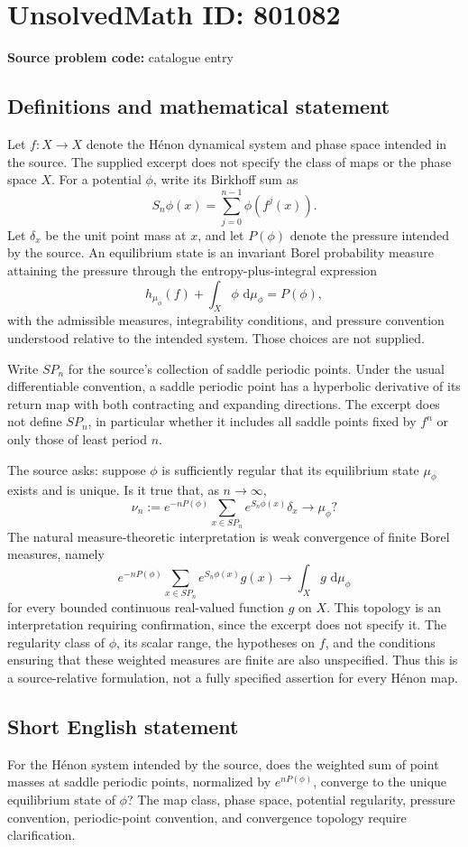 \documentclass[11pt]{article}
\newcommand{\dd}{\,\mathrm{d}}
\begin{document}
\section*{UnsolvedMath ID: 801082}
\textbf{Source problem code:} catalogue entry
\subsection{Definitions and mathematical statement}
Let \(f\colon X\to X\) denote the H\'enon dynamical system and phase space intended in the source. The supplied excerpt does not specify the class of maps or the phase space \(X\). For a potential \(\phi\), write its Birkhoff sum as
\[
S_n\phi(x)=\sum_{j=0}^{n-1}\phi(f^j(x)).
\]
Let \(\delta_x\) be the unit point mass at \(x\), and let \(P(\phi)\) denote the pressure intended by the source. An equilibrium state is an invariant Borel probability measure attaining the pressure through the entropy-plus-integral expression
\[
h_{\mu_\phi}(f)+\int_X\phi\,\dd\mu_\phi=P(\phi),
\]
with the admissible measures, integrability conditions, and pressure convention understood relative to the intended system. Those choices are not supplied.

Write \(SP_n\) for the source's collection of saddle periodic points. Under the usual differentiable convention, a saddle periodic point has a hyperbolic derivative of its return map with both contracting and expanding directions. The excerpt does not define \(SP_n\), in particular whether it includes all saddle points fixed by \(f^n\) or only those of least period \(n\).

The source asks: suppose \(\phi\) is sufficiently regular that its equilibrium state \(\mu_\phi\) exists and is unique. Is it true that, as \(n\to\infty\),
\[
\nu_n:=e^{-nP(\phi)}\sum_{x\in SP_n}e^{S_n\phi(x)}\delta_x
\longrightarrow\mu_\phi?
\]
The natural measure-theoretic interpretation is weak convergence of finite Borel measures, namely
\[
e^{-nP(\phi)}\sum_{x\in SP_n}e^{S_n\phi(x)}g(x)
\longrightarrow\int_X g\,\dd\mu_\phi
\]
for every bounded continuous real-valued function \(g\) on \(X\). This topology is an interpretation requiring confirmation, since the excerpt does not specify it. The regularity class of \(\phi\), its scalar range, the hypotheses on \(f\), and the conditions ensuring that these weighted measures are finite are also unspecified. Thus this is a source-relative formulation, not a fully specified assertion for every H\'enon map.
\subsection{Short English statement}
For the H\'enon system intended by the source, does the weighted sum of point masses at saddle periodic points, normalized by \(e^{nP(\phi)}\), converge to the unique equilibrium state of \(\phi\)? The map class, phase space, potential regularity, pressure convention, periodic-point convention, and convergence topology require clarification.
\end{document}
